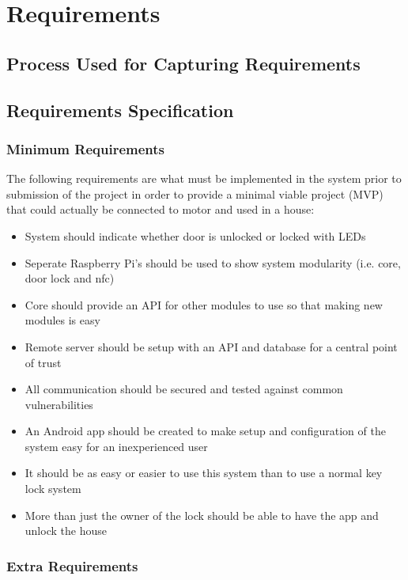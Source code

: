 \chapter{Requirements}
\label{chap:requirements}

\section{Process Used for Capturing Requirements}


\section{Requirements Specification}

\subsection{Minimum Requirements}
The following requirements are what must be implemented in the system prior to submission of the project in order to provide a minimal viable project (MVP) that could actually be connected to motor and used in a house:

\begin{itemize}
	\item System should indicate whether door is unlocked or locked with LEDs
	\item Seperate Raspberry Pi's should be used to show system modularity (i.e. core, door lock and nfc)
	\item Core should provide an API for other modules to use so that making new modules is easy
	\item Remote server should be setup with an API and database for a central point of trust
	\item All communication should be secured and tested against common vulnerabilities
	\item An Android app should be created to make setup and configuration of the system easy for an inexperienced user
	\item It should be as easy or easier to use this system than to use a normal key lock system
	\item More than just the owner of the lock should be able to have the app and unlock the house
\end{itemize}

\subsection{Extra Requirements}

